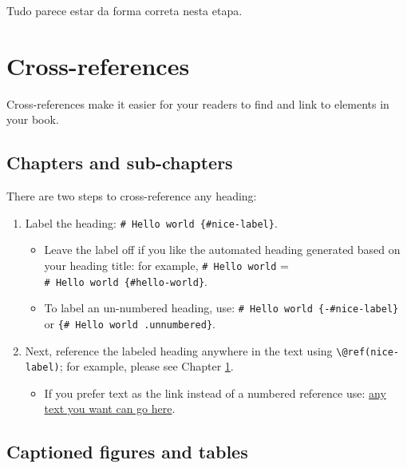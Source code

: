 \documentclass[
]{book}
\providecommand{\tightlist}{%
  \setlength{\itemsep}{0pt}\setlength{\parskip}{0pt}}
\theoremstyle{definition}
\theoremstyle{definition}
\theoremstyle{definition}
\theoremstyle{definition}
\theoremstyle{remark}
\begin{document}
Tudo parece estar da forma correta nesta etapa.

\hypertarget{cross}{%
\chapter{Cross-references}\label{cross}}

Cross-references make it easier for your readers to find and link to elements in your book.

\hypertarget{chapters-and-sub-chapters}{%
\section{Chapters and sub-chapters}\label{chapters-and-sub-chapters}}

There are two steps to cross-reference any heading:

\begin{enumerate}
\def\labelenumi{\arabic{enumi}.}
\tightlist
\item
  Label the heading: \texttt{\#\ Hello\ world\ \{\#nice-label\}}.

  \begin{itemize}
  \tightlist
  \item
    Leave the label off if you like the automated heading generated based on your heading title: for example, \texttt{\#\ Hello\ world} = \texttt{\#\ Hello\ world\ \{\#hello-world\}}.
  \item
    To label an un-numbered heading, use: \texttt{\#\ Hello\ world\ \{-\#nice-label\}} or \texttt{\{\#\ Hello\ world\ .unnumbered\}}.
  \end{itemize}
\item
  Next, reference the labeled heading anywhere in the text using \texttt{\textbackslash{}@ref(nice-label)}; for example, please see Chapter \ref{cross}.

  \begin{itemize}
  \tightlist
  \item
    If you prefer text as the link instead of a numbered reference use: \protect\hyperlink{cross}{any text you want can go here}.
  \end{itemize}
\end{enumerate}

\hypertarget{captioned-figures-and-tables}{%
\section{Captioned figures and tables}\label{captioned-figures-and-tables}}
\end{document}
